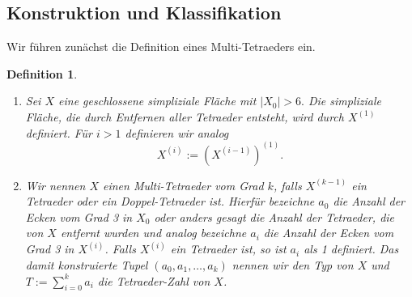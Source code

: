 \documentclass[12pt,titlepage,twoside,cleardoublepage]{article}
\theoremstyle{nummermitklammern}
\newtheorem{definition}[temp]{Definition}
\newtheorem{definition}[zahl]{Definition}
\numberwithin{equation}{section}
\begin{document}
\subsection{Konstruktion und Klassifikation}\label{cactus}
Wir führen zunächst die Definition eines Multi-Tetraeders ein.
\begin{definition}\label{defcac}
\begin{enumerate}
\item Sei $X$ eine geschlossene simpliziale Fläche mit $\vert X_0\vert > 6.$
 Die simpliziale Fläche, die durch Entfernen aller Tetraeder entsteht, wird durch $X^{(1)}$ definiert. Für $i>1$ definieren wir analog 
\[
X^{(i)}:=(X^{(i-1)})^{(1)}.
\]
\item Wir nennen $X$ einen \emph{Multi-Tetraeder vom Grad} $k$, falls $X^{(k-1)}$ ein Tetraeder oder ein Doppel-Tetraeder ist. Hierfür bezeichne $a_0$ die Anzahl der Ecken vom Grad 3 in $X_0$ oder anders gesagt die Anzahl der Tetraeder, die von $X$ entfernt wurden und analog bezeichne $a_i$ die Anzahl der Ecken vom Grad 3 in $X^{(i)}$. Falls $X^{(i)}$ ein Tetraeder ist, so ist $a_i$ als 1 definiert. Das damit konstruierte Tupel $(a_0,a_1,\ldots,a_k)$ nennen wir den \emph{Typ} von $X$ und $T:=\sum_{i=0}^{k} a_i$ die \emph{Tetraeder-Zahl} von $X$.\\
\end{enumerate}
\end{definition}
\end{document}
